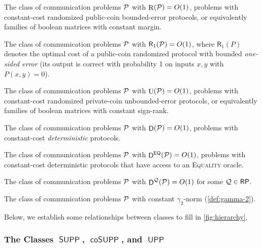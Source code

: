 \documentclass[conference]{IEEEtran}
\DeclareMathOperator{\U}{U}
\DeclareMathOperator{\Rand}{R}
\DeclareMathOperator{\D}{\mathsf{D}}
\newcommand{\cplxclass}[1]{\mathsf{#1}}
\let\P\undefined\DeclareMathOperator{\P}{\cplxclass{P}}
\DeclareMathOperator{\BPP}{\cplxclass{BPP}}
\DeclareMathOperator{\UPP}{\cplxclass{UPP}}
\DeclareMathOperator{\SUPP}{\cplxclass{SUPP}}
\DeclareMathOperator{\coSUPP}{\cplxclass{coSUPP}}
\DeclareMathOperator{\RP}{\cplxclass{RP}}
\newcommand{\EQ}{\mathsf{EQ}}
\begin{document}
\newcommand{\ROne}{\mathsf{R}_1}
\begin{description}[leftmargin=!,labelwidth=1.4cm,labelsep=0.5em]
    \item[$\BPP$:]
    The class of communication problems $\mathcal{P}$ with $\Rand(\cP)
    = O(1)$, \ie problems with constant-cost randomized public-coin
    bounded-error protocols, or equivalently families of boolean matrices with
    constant margin.
    \item[$\RP$:]
    The class of communication problems $\mathcal{P}$ with $\ROne(\cP) = O(1)$,
    where $\ROne(P)$ denotes the optimal cost of a public-coin randomized protocol
    with bounded \emph{one-sided error} (\ie its output is correct with probability 1
    on inputs $x,y$ with $P(x,y) = 0$).
    \item[$\UPP$:]
    The class of communication problems $\mathcal{P}$ with $\U(\cP) =
    O(1)$, \ie problems with constant-cost randomized private-coin
    unbounded-error protocols, or equivalently families of boolean matrices
    with constant sign-rank.
    \item[$\P$:]
    The class of communication problems $\mathcal{P}$ with $\D(\cP) = O(1)$,
    \ie problems with constant-cost \emph{deterministic} protocols.
    \item[$\P^\EQ$:]
    The class of communication problems $\mathcal{P}$ with $\D^\EQ(\cP) = O(1)$,
    \ie problems with constant-cost deterministic protocols that have access to
    an \textsc{Equality} oracle.
    \item[$\P^{\RP}$:]
    The class of communication problems $\mathcal{P}$ with $\D^\cQ(\cP) = O(1)$
    for some $\cQ \in \RP$.
    \item[$\Gamma_2$:]
    The class of communication problems $\mathcal{P}$ with constant $\gamma_2$-norm
    (\cref{def:gamma-2}).
\end{description}

Below, we establish some relationships between classes to fill in \cref{fig:hierarchy}.

\subsubsection{The Classes \texorpdfstring{$\SUPP$, $\coSUPP$, and $\UPP$}{SUPP, coSUPP, and UPP}}
\end{document}
